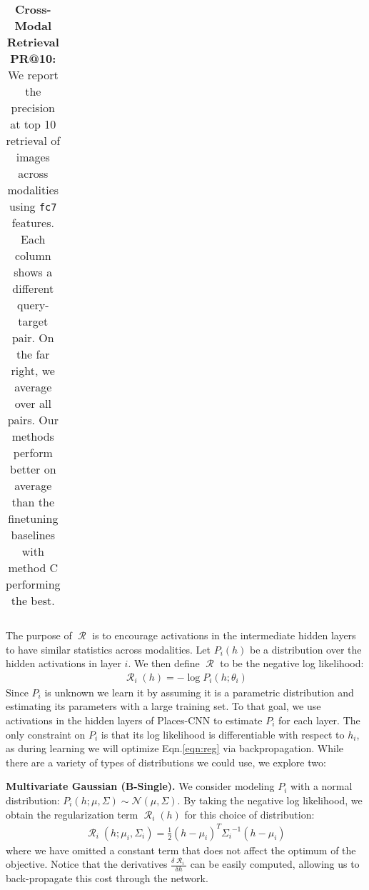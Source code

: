 \documentclass[10pt,journal,compsoc]{IEEEtran}
\DeclareMathOperator{\cR}{\mathcal{R}}
\begin{document}
\begin{table*}[t!]
\begin{center}
\begin{tabular}{|c|l||r r r r||r r r r||r r r r||r r r r||r r r r||r|}
			\hline
		\end{tabular}
		\egroup
	\end{center}
	\caption{\textbf{Cross-Modal Retrieval PR@10:} We report the precision at top 10 retrieval of images across modalities using \texttt{fc7} features. Each column shows a different query-target pair. On the far right, we average over all pairs. Our methods perform better on average than the finetuning baselines with method C performing the best.}
	\label{table:cross_modal_prs}
\end{table*}

    
    The purpose of $\cR$ is to encourage activations in the intermediate hidden layers to have similar statistics across modalities. Let $P_i(h)$ be a distribution over the hidden activations in layer $i$. We then define $\cR$ to be the negative log likelihood:
        \begin{align}
        \cR_i(h) = -\log P_i(h; \theta_i)
        \end{align}
    Since $P_i$ is unknown we learn it by assuming it is a parametric distribution and estimating its parameters with a large training set. To that goal, we use activations in the hidden layers of Places-CNN to estimate $P_i$ for each layer. The only constraint on $P_i$ is that its log likelihood is differentiable with respect to $h_i$, as during learning we will optimize Eqn.\ref{eqn:reg} via backpropagation. While there are a variety of types of distributions we could use, we explore two:
    
    \textbf{Multivariate Gaussian (B-Single).}
    We consider modeling $P_i$ with a normal distribution: $P_i(h; \mu, \Sigma) \sim \mathcal{N}(\mu, \Sigma)$.
    By taking the negative log likelihood, we obtain the regularization term $\cR_i(h)$ for this choice of distribution:
    \begin{align}
    \cR_i( h ; \mu_i,\Sigma_i)  = \frac{1}{2}({h}-{\mu_i})^T{\Sigma_i}^{-1}({h}-{\mu_i})  
    \end{align}
    where we have omitted a constant term that does not affect the optimum of the objective. Notice that the derivatives $\frac{\delta \cR_i}{\delta h}$ can be easily computed, allowing us to back-propagate this cost through the network. 
    
\end{document}
